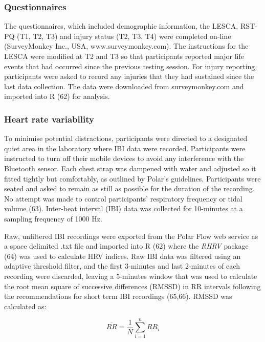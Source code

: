 \documentclass[
  english,
  man]{apa6}
\begin{document}
\hypertarget{questionnaires}{%
\subsubsection{Questionnaires}\label{questionnaires}}

The questionnaires, which included demographic information, the LESCA, RST-PQ (T1, T2, T3) and injury status (T2, T3, T4) were completed on-line (SurveyMonkey Inc., USA, www.surveymonkey.com).
The instructions for the LESCA were modified at T2 and T3 so that participants reported major life events that had occurred since the previous testing session.
For injury reporting, participants were asked to record any injuries that they had sustained since the last data collection.
The data were downloaded from surveymonkey.com and imported into R (62) for analysis.

\hypertarget{heart-rate-variability-1}{%
\subsubsection{Heart rate variability}\label{heart-rate-variability-1}}

To minimise potential distractions, participants were directed to a designated quiet area in the laboratory where IBI data were recorded.
Participants were instructed to turn off their mobile devices to avoid any interference with the Bluetooth sensor.
Each chest strap was dampened with water and adjusted so it fitted tightly but comfortably, as outlined by Polar's guidelines.
Participants were seated and asked to remain as still as possible for the duration of the recording.
No attempt was made to control participants' respiratory frequency or tidal volume (63).
Inter-beat interval (IBI) data was collected for 10-minutes at a sampling frequency of 1000 Hz.

Raw, unfiltered IBI recordings were exported from the Polar Flow web service as a space delimited .txt file and imported into R (62) where the \emph{RHRV} package (64) was used to calculate HRV indices.
Raw IBI data was filtered using an adaptive threshold filter, and the first 3-minutes and last 2-minutes of each recording were discarded, leaving a 5-minutes window that was used to calculate the root mean square of successive differences (RMSSD) in RR intervals following the recommendations for short term IBI recordings (65,66).
RMSSD was calculated as:

\begin{equation} 
  \overline{RR} = \frac{1}{N} \sum_{i=1}^{n} RR_i
\end{equation}
\end{document}
